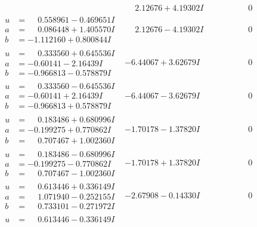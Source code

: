 \documentclass[1p]{elsarticle_modified}
\theoremstyle{definition}
\begin{document}
$$\begin{array}{c|c|c}
 & \phantom{-}2.12676 + 4.19302 I & \phantom{-0.000000 } 0 \\ \hline\begin{aligned}
u &= \phantom{-}0.558961 - 0.469651 I \\
a &= \phantom{-}0.086448 + 1.405570 I \\
b &= -1.112160 + 0.800844 I\end{aligned}
 & \phantom{-}2.12676 - 4.19302 I & \phantom{-0.000000 } 0 \\ \hline\begin{aligned}
u &= \phantom{-}0.333560 + 0.645536 I \\
a &= -0.60141 - 2.16439 I \\
b &= -0.966813 - 0.578879 I\end{aligned}
 & -6.44067 + 3.62679 I & \phantom{-0.000000 } 0 \\ \hline\begin{aligned}
u &= \phantom{-}0.333560 - 0.645536 I \\
a &= -0.60141 + 2.16439 I \\
b &= -0.966813 + 0.578879 I\end{aligned}
 & -6.44067 - 3.62679 I & \phantom{-0.000000 } 0 \\ \hline\begin{aligned}
u &= \phantom{-}0.183486 + 0.680996 I \\
a &= -0.199275 + 0.770862 I \\
b &= \phantom{-}0.707467 + 1.002360 I\end{aligned}
 & -1.70178 - 1.37820 I & \phantom{-0.000000 } 0 \\ \hline\begin{aligned}
u &= \phantom{-}0.183486 - 0.680996 I \\
a &= -0.199275 - 0.770862 I \\
b &= \phantom{-}0.707467 - 1.002360 I\end{aligned}
 & -1.70178 + 1.37820 I & \phantom{-0.000000 } 0 \\ \hline\begin{aligned}
u &= \phantom{-}0.613446 + 0.336149 I \\
a &= \phantom{-}1.071940 - 0.252155 I \\
b &= \phantom{-}0.733101 - 0.271972 I\end{aligned}
 & -2.67908 - 0.14330 I & \phantom{-0.000000 } 0 \\ \hline\begin{aligned}
u &= \phantom{-}0.613446 - 0.336149 I \\

\end{aligned}
\end{array}$$
\end{document}
